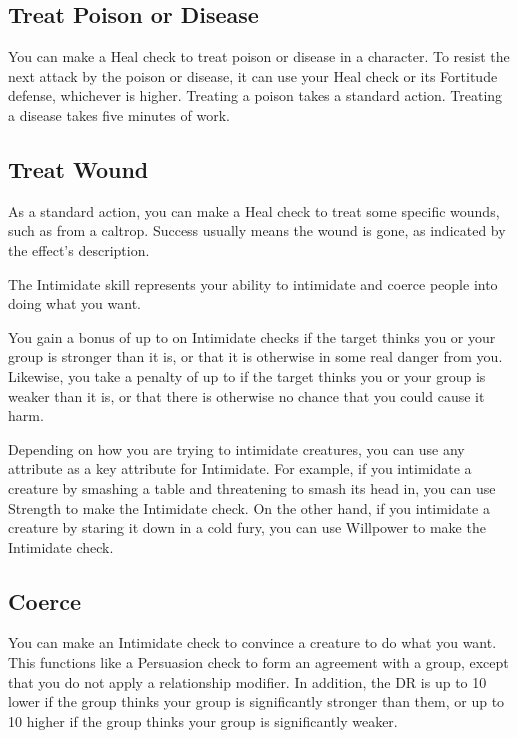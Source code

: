     \subsection{Treat Poison or Disease}
        You can make a Heal check to treat poison or disease in a character.
        To resist the next attack by the poison or disease, it can use your Heal check or its Fortitude defense, whichever is higher.
        Treating a poison takes a standard action. Treating a disease takes five minutes of work.

    \subsection{Treat Wound}
        As a standard action, you can make a Heal check to treat some specific wounds, such as from a caltrop. Success usually means the wound is gone, as indicated by the effect's description.

\newpage
{}
        The Intimidate skill represents your ability to intimidate and coerce people into doing what you want.

        You gain a bonus of up to  on Intimidate checks if the target thinks you or your group is stronger than it is, or that it is otherwise in some real danger from you. Likewise, you take a penalty of up to  if the target thinks you or your group is weaker than it is, or that there is otherwise no chance that you could cause it harm.

        Depending on how you are trying to intimidate creatures, you can use any attribute as a key attribute for Intimidate.
        For example, if you intimidate a creature by smashing a table and threatening to smash its head in, you can use Strength to make the Intimidate check.
        On the other hand, if you intimidate a creature by staring it down in a cold fury, you can use Willpower to make the Intimidate check.

    \subsection{Coerce}
        You can make an Intimidate check to convince a creature to do what you want. This functions like a Persuasion check to form an agreement with a group, except that you do not apply a relationship modifier. In addition, the DR is up to 10 lower if the group thinks your group is significantly stronger than them, or up to 10 higher if the group thinks your group is significantly weaker.

